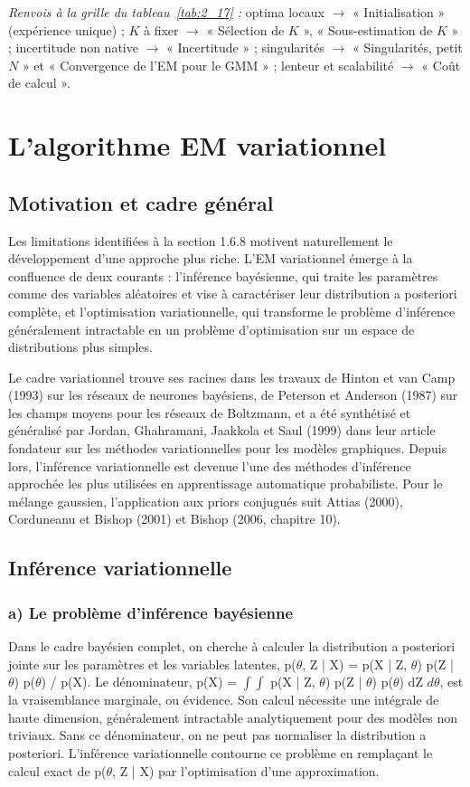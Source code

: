 \par\noindent\emph{Renvois à la grille du tableau~\ref{tab:2_17} :} optima locaux $\to$ « Initialisation » (expérience unique) ; $K$ à fixer $\to$ « Sélection de $K$ », « Sous-estimation de $K$ » ; incertitude non native $\to$ « Incertitude » ; singularités $\to$ « Singularités, petit $N$ » et « Convergence de l'EM pour le GMM » ; lenteur et scalabilité $\to$ « Coût de calcul ».
\section{L'algorithme EM variationnel}
\subsection{Motivation et cadre général}
Les limitations identifiées à la section 1.6.8 motivent naturellement le développement d'une approche plus riche. L'EM variationnel émerge à la confluence de deux courants : l'inférence bayésienne, qui traite les paramètres comme des variables aléatoires et vise à caractériser leur distribution a posteriori complète, et l'optimisation variationnelle, qui transforme le problème d'inférence  généralement intractable  en un problème d'optimisation sur un espace de distributions plus simples.

Le cadre variationnel trouve ses racines dans les travaux de Hinton et van Camp (1993) sur les réseaux de neurones bayésiens, de Peterson et Anderson (1987) sur les champs moyens pour les réseaux de Boltzmann, et a été synthétisé et généralisé par Jordan, Ghahramani, Jaakkola et Saul (1999) dans leur article fondateur sur les méthodes variationnelles pour les modèles graphiques. Depuis lors, l'inférence variationnelle est devenue l'une des méthodes d'inférence approchée les plus utilisées en apprentissage automatique probabiliste. Pour le mélange gaussien, l'application aux priors conjugués suit Attias (2000), Corduneanu et Bishop (2001) et Bishop (2006, chapitre 10).

\subsection{Inférence variationnelle}
\subsubsection{a) Le problème d'inférence bayésienne}
Dans le cadre bayésien complet, on cherche à calculer la distribution a posteriori jointe sur les paramètres et les variables latentes, p($\theta $, Z | X) = p(X | Z, $\theta $) p(Z | $\theta $) p($\theta $) / p(X). Le dénominateur, p(X) = $\int \int $ p(X | Z, $\theta $) p(Z | $\theta $) p($\theta $) dZ $d\theta $, est la vraisemblance marginale, ou évidence. Son calcul nécessite une intégrale de haute dimension, généralement intractable analytiquement pour des modèles non triviaux. Sans ce dénominateur, on ne peut pas normaliser la distribution a posteriori. L'inférence variationnelle contourne ce problème en remplaçant le calcul exact de p($\theta $, Z | X) par l'optimisation d'une approximation.

